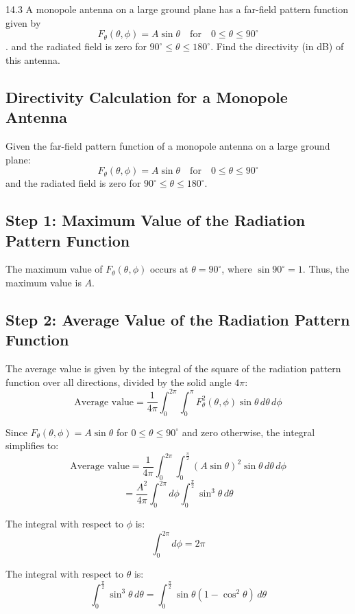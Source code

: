 \documentclass[cn,12pt]{homework}
\begin{document}
\newpage



14.3 A monopole antenna on a large ground plane has a far-field pattern function 
given by \[ F_\theta(\theta, \phi) = A \sin \theta \quad \text{for} \quad 0 \leq \theta \leq 90^\circ \]. 
and the radiated field is zero for \( 90^\circ \leq \theta \leq 180^\circ \). Find the directivity (in dB)
of this antenna.
\begin{solution}

\section*{Directivity Calculation for a Monopole Antenna}

Given the far-field pattern function of a monopole antenna on a large ground plane:
\[ F_\theta(\theta, \phi) = A \sin \theta \quad \text{for} \quad 0 \leq \theta \leq 90^\circ \]
and the radiated field is zero for \( 90^\circ \leq \theta \leq 180^\circ \).

\subsection*{Step 1: Maximum Value of the Radiation Pattern Function}
The maximum value of \( F_\theta(\theta, \phi) \) occurs at \( \theta = 90^\circ \), where \( \sin 90^\circ = 1 \). Thus, the maximum value is \( A \).

\subsection*{Step 2: Average Value of the Radiation Pattern Function}
The average value is given by the integral of the square of the radiation pattern function over all directions, divided by the solid angle \( 4\pi \):
\[ \text{Average value} = \frac{1}{4\pi} \int_0^{2\pi} \int_0^\pi F_\theta^2(\theta, \phi) \sin \theta \, d\theta \, d\phi \]

Since \( F_\theta(\theta, \phi) = A \sin \theta \) for \( 0 \leq \theta \leq 90^\circ \) and zero otherwise, the integral simplifies to:
\[ \text{Average value} = \frac{1}{4\pi} \int_0^{2\pi} \int_0^{\frac{\pi}{2}} (A \sin \theta)^2 \sin \theta \, d\theta \, d\phi \]
\[ = \frac{A^2}{4\pi} \int_0^{2\pi} d\phi \int_0^{\frac{\pi}{2}} \sin^3 \theta \, d\theta \]

The integral with respect to \( \phi \) is:
\[ \int_0^{2\pi} d\phi = 2\pi \]

The integral with respect to \( \theta \) is:
\[ \int_0^{\frac{\pi}{2}} \sin^3 \theta \, d\theta = \int_0^{\frac{\pi}{2}} \sin \theta (1 - \cos^2 \theta) \, d\theta \]


\end{solution}
\end{document}
